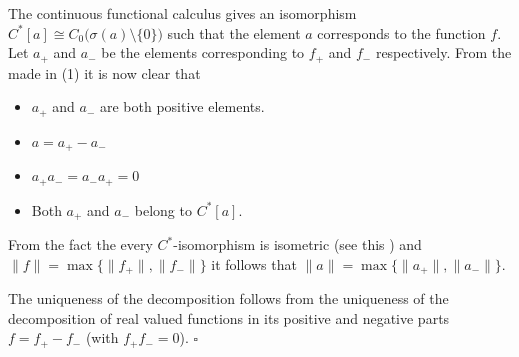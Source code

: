\documentclass[12pt]{article}
\begin{document}
The continuous functional calculus gives an isomorphism $C^*[a] \cong C_0\big(\sigma(a)\setminus \{0\}\big)$ such that the element $a$ corresponds to the function $f$. Let $a_+$ and $a_-$ be the elements corresponding to $f_+$ and $f_-$ respectively. From the  made in (1) it is now clear that
\begin{itemize}
\item $a_+$ and $a_-$ are both positive elements.
\item $a = a_+ - a_-$
\item $a_+a_- = a_-a_+ = 0$
\item Both $a_+$ and $a_-$ belong to $C^*[a]$.
\end{itemize}

From the fact the every $C^*$-isomorphism is isometric (see this ) and $\|f\| = \max\{\|f_+\|, \|f_-\|\}$ it follows that $\|a\| = \max\{\|a_+\|, \|a_-\|\}$.

The uniqueness of the decomposition follows from the uniqueness of the decomposition of real valued functions in its positive and negative parts $f = f_+-f_-$ (with $f_+f_- = 0$). $\square$
\end{document}
